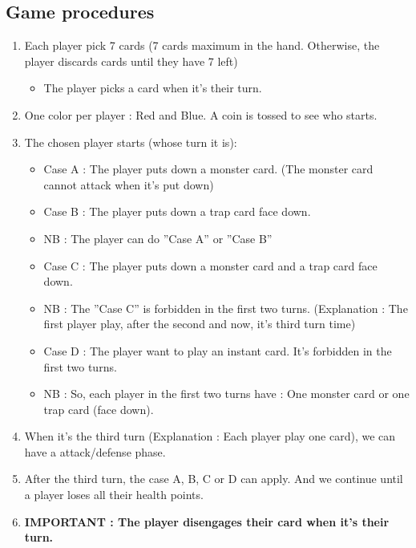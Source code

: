 \documentclass[a4paper,12pt]{book}
\begin{document}
\subsection{Game procedures}
\begin{enumerate}
	\item Each player pick 7 cards (7 cards maximum in the hand. Otherwise, the player discards cards until they have 7 left)
	\begin{itemize}
		\item The player picks a card when it's their turn.
	\end{itemize}
		\item One color per player : Red and Blue. A coin is tossed to see who starts.
		\item The chosen player starts (whose turn it is):
	\begin{itemize}
		\item Case A : The player puts down a monster card. (The monster card cannot attack when it's put down)
		\item Case B : The player puts down a trap card face down.
		\item NB : The player can do ''Case A'' or ''Case B''
		\item Case C : The player puts down a monster card and a trap card face down.
		\item NB : The ''Case C'' is forbidden in the first two turns. (Explanation : The first player play, after the second and now, it's third turn time)
		\item Case D : The player want to play an instant card. It's forbidden in the first two turns.
		\item NB : So, each player in the first two turns have : One monster card or one trap card (face down).
	\end{itemize}
	\item When it's the third turn (Explanation : Each player play one card), we can have a attack/defense phase.
\item After the third turn, the case A, B, C or D can apply. And we continue until a player loses all their health points.
\item \textbf{IMPORTANT : The player disengages their card when it's their turn.}
\end{enumerate}
\end{document}
